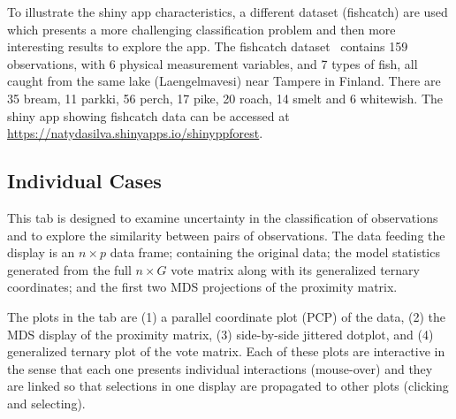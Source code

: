 \documentclass[smallextended,natbib]{svjour3}\usepackage[]{graphicx}\usepackage[]{xcolor}
\begin{document}
To illustrate the shiny app characteristics, a different dataset (fishcatch) are used which presents a more challenging classification problem and then more interesting results to explore the app. The fishcatch dataset~\citep{fishcatch} contains 159 observations, with 6 physical measurement variables, and  7 types of fish, all caught from the same lake (Laengelmavesi) near Tampere in Finland. There are 35 bream, 11 parkki, 56 perch, 17 pike, 20 roach, 14 smelt and 6 whitewish. The shiny app showing fishcatch data can be accessed at \url{https://natydasilva.shinyapps.io/shinyppforest}.

\subsection{Individual Cases}

This tab is designed to examine uncertainty in the classification of observations and to explore the similarity between pairs of observations. The data feeding the display is an $n\times p$ data frame; containing the original data; the model statistics generated from the full $n\times G$ vote matrix along with its generalized ternary coordinates; and the first two MDS projections of the proximity matrix.

The plots in the tab are (1) a parallel coordinate plot (PCP) of the data, (2) the MDS display of the proximity matrix, (3) side-by-side jittered dotplot, and (4) generalized ternary plot of the vote matrix. Each of these plots are interactive in the sense that each one presents individual interactions (mouse-over) and they are linked so that selections in one display are propagated to other plots (clicking and selecting).
\end{document}
